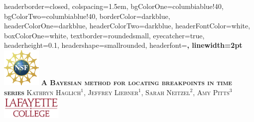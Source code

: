 \documentclass[landscape,a0paper,fontscale=0.285]{baposter} %
\begin{document}
\begin{poster}
{
headerborder=closed, %
colspacing=1.5em, %
bgColorOne=columbiablue!40, %
bgColorTwo=columbiablue!40, %
borderColor=darkblue, %
headerColorOne=darkblue, %
headerColorTwo=darkblue, %
headerFontColor=white, %
boxColorOne=white, %
textborder=roundedsmall, %
eyecatcher=true, %
headerheight=0.1\textheight, %
headershape=smallrounded, %
headerfont=\Large\bf\textsc, %
linewidth=2pt %
}
%
{\includegraphics[height=5em]{nsf.png}} %
{\bf\textsc{A Bayesian method for locating breakpoints in time series}\vspace{0.5em}} %
{\textsc{ {\LARGE Kathryn Haglich$^{1}$, Jeffrey Liebner$^{1}$, Sarah Neitzel$^{2}$, Amy Pitts$^{3}$  \hspace{12pt} }  } }%
{\includegraphics[height=3em]{lafayette-college.png}} %


\end{poster}
\end{document}
